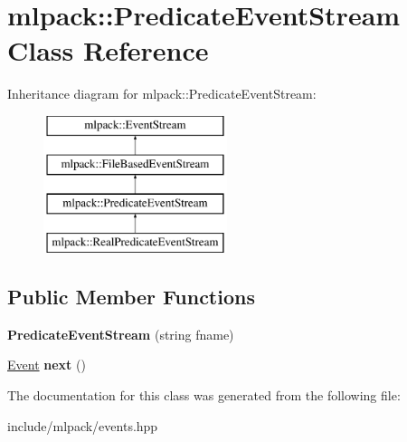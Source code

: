 \hypertarget{classmlpack_1_1_predicate_event_stream}{
\section{mlpack::PredicateEventStream Class Reference}
\label{classmlpack_1_1_predicate_event_stream}
}
Inheritance diagram for mlpack::PredicateEventStream:\begin{figure}[H]
\begin{center}
\leavevmode
\includegraphics[height=4.000000cm]{classmlpack_1_1_predicate_event_stream}
\end{center}
\end{figure}
\subsection*{Public Member Functions}
\begin{DoxyCompactItemize}
\item 
\hypertarget{classmlpack_1_1_predicate_event_stream_ae4b2e2633ba3a789500abf1eb3787c9b}{
{\bfseries PredicateEventStream} (string fname)}
\label{classmlpack_1_1_predicate_event_stream_ae4b2e2633ba3a789500abf1eb3787c9b}

\item 
\hypertarget{classmlpack_1_1_predicate_event_stream_affb1a6e31e9ab7d68167f357c37e6b1b}{
\hyperlink{structmlpack_1_1_event}{Event} {\bfseries next} ()}
\label{classmlpack_1_1_predicate_event_stream_affb1a6e31e9ab7d68167f357c37e6b1b}

\end{DoxyCompactItemize}


The documentation for this class was generated from the following file:\begin{DoxyCompactItemize}
\item 
include/mlpack/events.hpp\end{DoxyCompactItemize}
